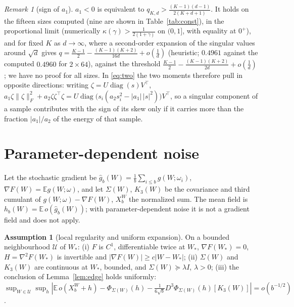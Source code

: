 \documentclass[10pt]{article}
\theoremstyle{definition}
\newtheorem{assumption}{Assumption}
\theoremstyle{remark}
\newtheorem{remark}[theorem]{Remark}
\newcommand{\E}{\mathbb{E}}
\newcommand{\nF}[1]{\|#1\|_{F}}
\begin{document}
\begin{remark}[sign of $a_1$]\label{rem:a1}
$a_1<0$ is equivalent to $q_{K,d}>\frac{(K-1)(d-1)}{2(K+d+1)}$. It holds on the fifteen sizes computed (nine are shown in
Table~\ref{tab:const}), in the proportional limit (numerically $\kappa(\gamma)>\frac1{2(1+\gamma)}$ on $(0,1]$, with equality
at $0^+$), and for fixed $K$ as $d\to\infty$, where a second-order expansion of the singular values around $\sqrt d$ gives
$q=\frac{K-1}2-\frac{(K-1)(K+2)}{16d}+o(\frac1d)$ (heuristic; $0.4961$ against the computed $0.4960$ for $2\times64$),
against the threshold
$\frac{K-1}2-\frac{(K-1)(K+2)}{2d}+o(\frac1d)$; we have no proof for all sizes. In \eqref{eq:two} the two moments therefore
pull in opposite directions: writing $\zeta=U\operatorname{diag}(s)V^\top$,
$a_1\zeta\nF\zeta^2+a_2\zeta\zeta^\top\zeta=U\operatorname{diag}\big(s_i(a_2s_i^2-|a_1|\,|s|^2)\big)V^\top$, so a singular
component of a sample contributes with the sign of its skew only if it carries more than the fraction $|a_1|/a_2$ of the
energy of that sample.
\end{remark}

\section{Parameter-dependent noise}\label{sec:state}

Let the stochastic gradient be $\hat g_b(W)=\frac1b\sum_{i\le b}g(W;\omega_i)$, $\nabla F(W)=\E g(W;\omega)$, and let
$\Sigma(W)$, $K_3(W)$ be the covariance and third cumulant of $g(W;\omega)-\nabla F(W)$, $X_b^W$ the normalized sum. The
mean field is $h_b(W)=\E\,o(\hat g_b(W))$; with parameter-dependent noise it is not a gradient field and
\cite[Theorem~2]{manuscript} does not apply.

\begin{assumption}[local regularity and uniform expansion]\label{ass:U}
On a bounded neighbourhood $\mathcal U$ of $W_\ast$: (i) $F$ is $C^1$, differentiable twice at $W_\ast$,
$\nabla F(W_\ast)=0$, $H=\nabla^2F(W_\ast)$ is invertible and $|\nabla F(W)|\ge c|W-W_\ast|$; (ii) $\Sigma(W)$ and
$K_3(W)$ are continuous at $W_\ast$, bounded, and $\Sigma(W)\succeq\lambda I$, $\lambda>0$; (iii) the conclusion of
Lemma~\ref{lem:edge} holds uniformly:
$\sup_{W\in\mathcal U}\sup_h|\E\,o(X_b^W+h)-\Phi_{\Sigma(W)}(h)-\frac1{6\sqrt b}D^3\Phi_{\Sigma(W)}(h)[K_3(W)]|=o(b^{-1/2})$.
\end{assumption}
\end{document}

